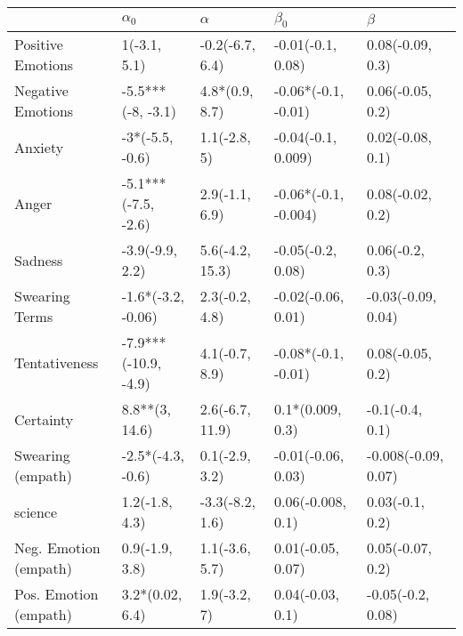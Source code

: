 \begin{tabular}{lllll}
\toprule
{} &            $\alpha_0$ &         $\alpha$ &             $\beta_0$ &              $\beta$ \\
\midrule
Positive Emotions     &          1(-3.1, 5.1) &  -0.2(-6.7, 6.4) &     -0.01(-0.1, 0.08) &     0.08(-0.09, 0.3) \\
Negative Emotions     &     -5.5***(-8, -3.1) &   4.8*(0.9, 8.7) &   -0.06*(-0.1, -0.01) &     0.06(-0.05, 0.2) \\
Anxiety               &       -3*(-5.5, -0.6) &     1.1(-2.8, 5) &    -0.04(-0.1, 0.009) &     0.02(-0.08, 0.1) \\
Anger                 &   -5.1***(-7.5, -2.6) &   2.9(-1.1, 6.9) &  -0.06*(-0.1, -0.004) &     0.08(-0.02, 0.2) \\
Sadness               &       -3.9(-9.9, 2.2) &  5.6(-4.2, 15.3) &     -0.05(-0.2, 0.08) &      0.06(-0.2, 0.3) \\
Swearing Terms        &    -1.6*(-3.2, -0.06) &   2.3(-0.2, 4.8) &    -0.02(-0.06, 0.01) &   -0.03(-0.09, 0.04) \\
Tentativeness         &  -7.9***(-10.9, -4.9) &   4.1(-0.7, 8.9) &   -0.08*(-0.1, -0.01) &     0.08(-0.05, 0.2) \\
Certainty             &        8.8**(3, 14.6) &  2.6(-6.7, 11.9) &      0.1*(0.009, 0.3) &      -0.1(-0.4, 0.1) \\
Swearing (empath)     &     -2.5*(-4.3, -0.6) &   0.1(-2.9, 3.2) &    -0.01(-0.06, 0.03) &  -0.008(-0.09, 0.07) \\
science               &        1.2(-1.8, 4.3) &  -3.3(-8.2, 1.6) &     0.06(-0.008, 0.1) &      0.03(-0.1, 0.2) \\
Neg. Emotion (empath) &        0.9(-1.9, 3.8) &   1.1(-3.6, 5.7) &     0.01(-0.05, 0.07) &     0.05(-0.07, 0.2) \\
Pos. Emotion (empath) &       3.2*(0.02, 6.4) &     1.9(-3.2, 7) &      0.04(-0.03, 0.1) &    -0.05(-0.2, 0.08) \\
\bottomrule
\end{tabular}
